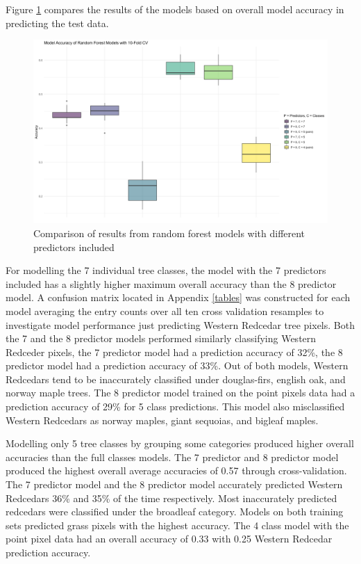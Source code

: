 \documentclass[12pt,twoside]{reedthesis}
\begin{document}
Figure \ref{fig:rfresults} compares the results of the models based on overall model accuracy in predicting the test data.
\begin{figure}

{\centering \includegraphics[width=0.9\linewidth]{figure/rfresults} 

}

\caption{Comparison of results from random forest models with different predictors included}\label{fig:rfresults}
\end{figure}
For modelling the 7 individual tree classes, the model with the 7 predictors included has a slightly higher maximum overall accuracy than the 8 predictor model. A confusion matrix located in Appendix \ref{tables} was constructed for each model averaging the entry counts over all ten cross validation resamples to investigate model performance just predicting Western Redcedar tree pixels. Both the 7 and the 8 predictor models performed similarly classifying Western Redceder pixels, the 7 predictor model had a prediction accuracy of 32\%, the 8 predictor model had a prediction accuracy of 33\%. Out of both models, Western Redcedars tend to be inaccurately classified under douglas-firs, english oak, and norway maple trees. The 8 predictor model trained on the point pixels data had a prediction accuracy of 29\% for 5 class predictions. This model also misclassified Western Redcedars as norway maples, giant sequoias, and bigleaf maples.

Modelling only 5 tree classes by grouping some categories produced higher overall accuracies than the full classes models. The 7 predictor and 8 predictor model produced the highest overall average accuracies of 0.57 through cross-validation. The 7 predictor model and the 8 predictor model accurately predicted Western Redcedars 36\% and 35\% of the time respectively. Most inaccurately predicted redcedars were classified under the broadleaf category. Models on both training sets predicted grass pixels with the highest accuracy. The 4 class model with the point pixel data had an overall accuracy of 0.33 with 0.25 Western Redcedar prediction accuracy.
\end{document}
